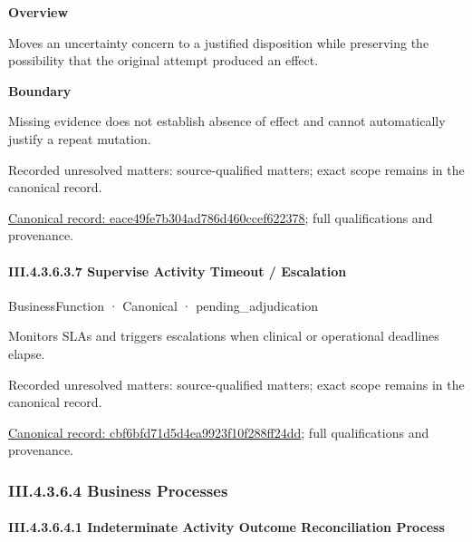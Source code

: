 \textbf{Overview}



Moves an uncertainty concern to a justified disposition while preserving the possibility that the original attempt produced an effect.



\textbf{Boundary}



Missing evidence does not establish absence of effect and cannot automatically justify a repeat mutation.


{\small Recorded unresolved matters: source-qualified matters; exact scope remains in the canonical record.}\par
{\footnotesize \href{../../../../../../../../continuum/business/business-function/eace49fe7b304ad786d460ccef622378.md}{Canonical record: eace49fe7b304ad786d460ccef622378}; full qualifications and provenance.}\par
\paragraph*{III.4.3.6.3.7 Supervise Activity Timeout / Escalation}
\label{navigation:III.4.3.6.3.7}

\label{element:cbf6bfd71d5d4ea9923f10f288ff24dd}
{\small BusinessFunction · Canonical · pending\_adjudication}\par

Monitors SLAs and triggers escalations when clinical or operational deadlines elapse.


{\small Recorded unresolved matters: source-qualified matters; exact scope remains in the canonical record.}\par
{\footnotesize \href{../../../../../../../../continuum/business/business-function/cbf6bfd71d5d4ea9923f10f288ff24dd.md}{Canonical record: cbf6bfd71d5d4ea9923f10f288ff24dd}; full qualifications and provenance.}\par
\subsubsection*{III.4.3.6.4 Business Processes}
\label{navigation:III.4.3.6.4}

\paragraph*{III.4.3.6.4.1 Indeterminate Activity Outcome Reconciliation Process}
\label{navigation:III.4.3.6.4.1}

